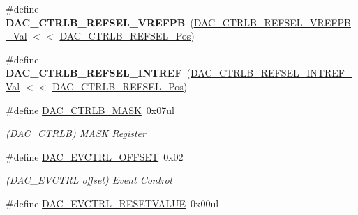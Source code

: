 \begin{DoxyCompactItemize}
\item 
\hypertarget{group___s_a_m_l21___d_a_c_gae2b32bff7e12d34e015fb70bd522e7b5}{}\#define {\bfseries D\+A\+C\+\_\+\+C\+T\+R\+L\+B\+\_\+\+R\+E\+F\+S\+E\+L\+\_\+\+V\+R\+E\+F\+P\+B}~(\hyperlink{group___s_a_m_l21___d_a_c_gaf0266310f4ffdab4a62aed8023e5507c}{D\+A\+C\+\_\+\+C\+T\+R\+L\+B\+\_\+\+R\+E\+F\+S\+E\+L\+\_\+\+V\+R\+E\+F\+P\+B\+\_\+\+Val}   $<$$<$ \hyperlink{group___s_a_m_l21___d_a_c_gace1da3ee1cda6efe12a220080a718b99}{D\+A\+C\+\_\+\+C\+T\+R\+L\+B\+\_\+\+R\+E\+F\+S\+E\+L\+\_\+\+Pos})\label{group___s_a_m_l21___d_a_c_gae2b32bff7e12d34e015fb70bd522e7b5}

\item 
\hypertarget{group___s_a_m_l21___d_a_c_gaf28703bc73b38b9ab5d0b56fb9a3e951}{}\#define {\bfseries D\+A\+C\+\_\+\+C\+T\+R\+L\+B\+\_\+\+R\+E\+F\+S\+E\+L\+\_\+\+I\+N\+T\+R\+E\+F}~(\hyperlink{group___s_a_m_l21___d_a_c_ga23d7b33954fbff27f8d3dcdcf389c185}{D\+A\+C\+\_\+\+C\+T\+R\+L\+B\+\_\+\+R\+E\+F\+S\+E\+L\+\_\+\+I\+N\+T\+R\+E\+F\+\_\+\+Val}   $<$$<$ \hyperlink{group___s_a_m_l21___d_a_c_gace1da3ee1cda6efe12a220080a718b99}{D\+A\+C\+\_\+\+C\+T\+R\+L\+B\+\_\+\+R\+E\+F\+S\+E\+L\+\_\+\+Pos})\label{group___s_a_m_l21___d_a_c_gaf28703bc73b38b9ab5d0b56fb9a3e951}

\item 
\hypertarget{group___s_a_m_l21___d_a_c_gaa12ea04e34d8557ae1e628862714e207}{}\#define \hyperlink{group___s_a_m_l21___d_a_c_gaa12ea04e34d8557ae1e628862714e207}{D\+A\+C\+\_\+\+C\+T\+R\+L\+B\+\_\+\+M\+A\+S\+K}~0x07ul\label{group___s_a_m_l21___d_a_c_gaa12ea04e34d8557ae1e628862714e207}

\begin{DoxyCompactList}\small\item\em (D\+A\+C\+\_\+\+C\+T\+R\+L\+B) M\+A\+S\+K Register \end{DoxyCompactList}\item 
\hypertarget{group___s_a_m_l21___d_a_c_ga554a475582005e674b535a88927abc9f}{}\#define \hyperlink{group___s_a_m_l21___d_a_c_ga554a475582005e674b535a88927abc9f}{D\+A\+C\+\_\+\+E\+V\+C\+T\+R\+L\+\_\+\+O\+F\+F\+S\+E\+T}~0x02\label{group___s_a_m_l21___d_a_c_ga554a475582005e674b535a88927abc9f}

\begin{DoxyCompactList}\small\item\em (D\+A\+C\+\_\+\+E\+V\+C\+T\+R\+L offset) Event Control \end{DoxyCompactList}\item 
\hypertarget{group___s_a_m_l21___d_a_c_gae95bd54234ae16d3e9ee3291b4c883c5}{}\#define \hyperlink{group___s_a_m_l21___d_a_c_gae95bd54234ae16d3e9ee3291b4c883c5}{D\+A\+C\+\_\+\+E\+V\+C\+T\+R\+L\+\_\+\+R\+E\+S\+E\+T\+V\+A\+L\+U\+E}~0x00ul\label{group___s_a_m_l21___d_a_c_gae95bd54234ae16d3e9ee3291b4c883c5}


\end{DoxyCompactItemize}
